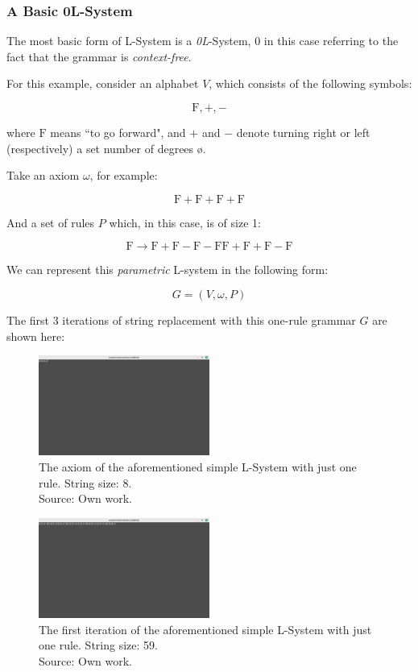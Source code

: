 \subsubsection{A Basic 0L-System} \label{lbasic}

The most basic form of L-System is a \emph{0L}-System, 0 in this case referring to the fact that the grammar is \emph{context-free}.

For this example\cite{lsyspaulbourke}, consider an alphabet $V$, which consists of the following symbols:

\newcommand{\F}{\mbox{F}}

$$ \F, +, - $$

where $\F$ means ``to go forward", and $+$ and $-$ denote turning right or left (respectively) a set number of degrees \o.

Take an axiom $\omega$, for example:

$$ \F+\F+\F+\F $$

And a set of rules $P$ which, in this case, is of size 1:

$$ \F \rightarrow \F+\F-\F-\F\F+\F+\F-\F $$

We can represent this \emph{parametric} L-system in the following form:\cite{houdinilsystems}

$$ G = (V, \omega, P) $$

The first 3 iterations of string replacement with this one-rule grammar $G$ are shown here:

\begin{figure}[H]
	\centering
	\includegraphics[width=0.5\textwidth]{Images/initial-l-system-iteration-0.png}
	\caption{The axiom of the aforementioned simple L-System with just one rule. String size: 8.\\Source: Own work.}
	\label{fig:lsysiter0}
\end{figure}

\begin{figure}[H]
	\centering
	\includegraphics[width=0.5\textwidth]{Images/initial-l-system-iteration-1.png}
	\caption{The first iteration of the aforementioned simple L-System with just one rule. String size: 59.\\Source: Own work.}
	\label{fig:lsysiter1}
\end{figure}

